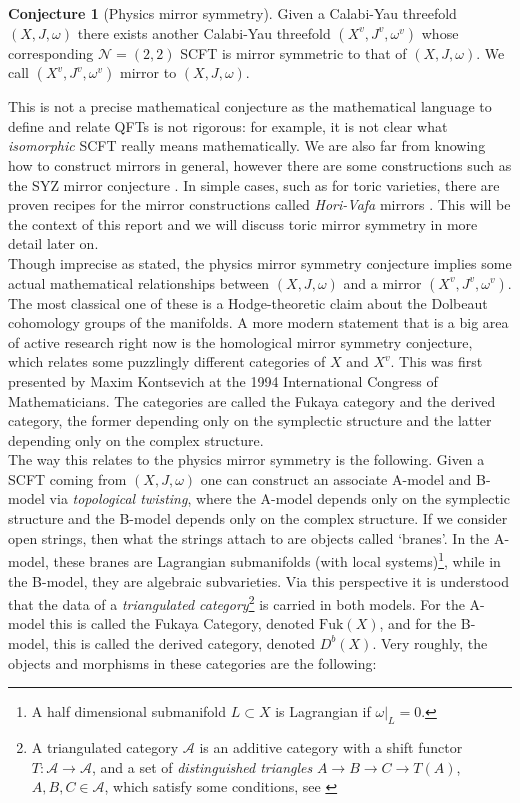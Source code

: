 \documentclass[oneside,reqno]{amsart}
\theoremstyle{definition}
\theoremstyle{definition}
\newtheorem{conjecture}{Conjecture}[section]
\theoremstyle{definition}
\theoremstyle{definition}
\begin{document}
\begin{conjecture}[Physics mirror symmetry]
Given a Calabi-Yau threefold $(X, J, \omega)$ there exists
another Calabi-Yau threefold $(X^{v}, J^{v}, \omega^{v})$ whose corresponding $\mathcal{N}=(2,2)$ SCFT is mirror symmetric to that of $(X, J, \omega)$. We call $(X^{v}, J^{v}, \omega^{v})$ mirror to $(X, J, \omega)$.
\end{conjecture}
\noindent
This is not a precise mathematical conjecture as the mathematical language to define and relate QFTs is not rigorous: for example, it is not clear what \textit{isomorphic} SCFT really means mathematically. We are also far from knowing how to construct mirrors in general, however there are some constructions such as the SYZ mirror conjecture \cite{syz}. In simple cases, such as for toric varieties, there are proven recipes for the mirror constructions called \textit{Hori-Vafa} mirrors \cite{horivafa}. This will be the context of this report and we will discuss toric mirror symmetry in more detail later on. \\
\newline
Though imprecise as stated, the physics mirror symmetry conjecture  implies some actual mathematical relationships between $(X, J, \omega)$ and a mirror $(X^{v}, J^{v}, \omega^{v})$. The most classical one of these is a Hodge-theoretic claim about the Dolbeaut cohomology groups of the manifolds. A more modern statement that is a big area of active research right now is the homological mirror symmetry conjecture, which relates some puzzlingly different categories of $X$ and $X^v$. This was first presented by Maxim Kontsevich at the 1994 International Congress of Mathematicians. The categories are called the Fukaya category and the derived category, the former depending only on the symplectic structure and the latter depending only on the complex structure. \\
\newline
The way this relates to the physics mirror symmetry is the following. Given a SCFT coming from $(X,J,\omega)$ one can construct an associate A-model and B-model via \textit{topological twisting}, where the A-model depends only on the symplectic structure and the B-model depends only on the complex structure. If we consider open strings, then what the strings attach to are objects called ‘branes’. In the A-model, these branes are Lagrangian submanifolds (with local systems)\footnote{A half dimensional submanifold $L \subset X$ is Lagrangian if $\omega|_{L} =0$.}, while in the B-model, they are algebraic subvarieties. Via this perspective it is understood that the data of a \textit{triangulated category}\footnote{A triangulated category $\mathcal{A}$ is an additive category with a shift functor $T:\mathcal{A} \to \mathcal{A}$, and a set of \textit{distinguished triangles} $A \to B \to C \to T(A) $, $A,B,C \in \mathcal{A}$, which satisfy some conditions, see \cite[Chapter 1]{huybrechts} } is carried in both models. For the A-model this is called the Fukaya Category, denoted $\text{Fuk}(X)$, and for the B-model, this is called the derived category, denoted $D^b(X)$. Very roughly, the objects and morphisms in these categories are the following:
\end{document}
